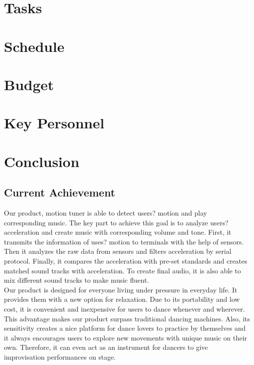 \documentclass{article}
\begin{document}


\section{Tasks}

\section{Schedule}

\section{Budget}


\section{Key Personnel}

\newpage
\section{Conclusion}
\subsection{Current Achievement}
\hspace*{2em}Our product, motion tuner is able to detect users? motion and play corresponding music. The key part to achieve this goal is to analyze users? acceleration and create music with corresponding volume and tone. First, it transmits the information of uses? motion to terminals with the help of sensors. Then it analyzes the raw data from sensors and filters acceleration by serial protocol. Finally, it compares the acceleration with pre-set standards and creates matched sound tracks with acceleration. To create final audio, it is also able to mix different sound tracks to make music fluent. \\
\hspace*{2em}Our product is designed for everyone living under pressure in everyday life. It provides them with a new option for relaxation. Due to its portability and low cost, it is convenient and inexpensive for users to dance whenever and wherever. This advantage makes our product surpass traditional dancing machines. Also, its sensitivity creates a nice platform for dance lovers to practice by themselves and it always encourages users to explore new movements with unique music on their own. Therefore, it can even act as an instrument for dancers to give improvisation performances on stage.
\end{document}

